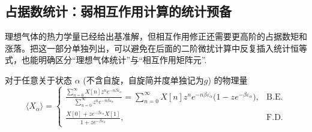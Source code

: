 \subsection{占据数统计：弱相互作用计算的统计预备}

理想气体的热力学量已经给出基准解，但相互作用修正还需要更高阶的占据数矩和涨落。把这一部分单独列出，可以避免在后面的二阶微扰计算中反复插入统计恒等式，也能明确区分“理想气体统计”与“相互作用矩阵元”.

对于任意关于状态 \(\alpha\) (不含自旋，自旋简并度单独记为\(g\)) 的物理量
\begin{equation*}
	\langle X_{\alpha} \rangle =
	\begin{cases}
		\displaystyle \frac{ \sum_{n=0}^{\infty} X[n] z^{n} e^{-n \beta \varepsilon_{\alpha}}}{ \sum_{n=0}^{\infty} z^{n} e^{-n \beta \varepsilon_{\alpha}}} = \sum_{n=0}^{\infty} X[n] z^{n} e^{-n \beta \varepsilon_{\alpha}} \bigl( 1 - z e^{-\beta \varepsilon_{\alpha}} \bigr), & \text{B.E.} \\[12pt]
		\displaystyle \frac{X[0] + z e^{-\beta \varepsilon_{\alpha}} X[1]}{1 + z e^{-\beta \varepsilon_{\alpha}}},                                                                                                                                                                   & \text{F.D.}
	\end{cases}
\end{equation*}

